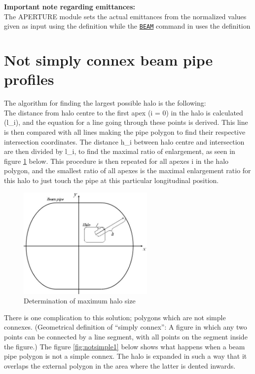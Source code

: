 {\bf Important note regarding emittances:}\\
The APERTURE module sets the actual emittances from the normalized values
given as input using the definition 
while the \hyperref[chap:beam]{\tt BEAM} command in \madx uses the definition 


\section{Not simply connex beam pipe profiles} 
\label{sec:notconnex}
The algorithm for finding the largest possible halo is the following: \\
The distance from halo centre to the first apex (i = 0)
in the halo is calculated (l\_i), and the equation for a line going
through these points is derived. This line is then compared with all
lines making the pipe polygon to find their respective intersection
coordinates. The distance h\_i between halo centre and intersection are
then divided by l\_i, to find the maximal ratio of enlargement, as seen
in figure \ref{fig:notsimple0} below. 
This procedure is then repeated for all apexes i in the halo
polygon, and the smallest ratio  of all apexes is the maximal
enlargement ratio for this halo to just touch the pipe at this
particular longitudinal position. 

\begin{figure}[h]
  \begin{center}
    \includegraphics[width=250px]{jpg/notsimple0.jpg}
    \caption{Determination of maximum halo size}
    \label{fig:notsimple0}
  \end{center}
\end{figure}

There is one complication to this solution; polygons which are not
simple connexes. (Geometrical definition of ``simply connex'': A figure
in which any two points can be connected by a line segment, with all
points on the segment inside the figure.) The figure \ref{fig:notsimple1}
below shows what happens when a beam pipe polygon is not a simple
connex. The halo is expanded in such a way that it overlaps the external
polygon in the area where the latter is dented inwards. 

